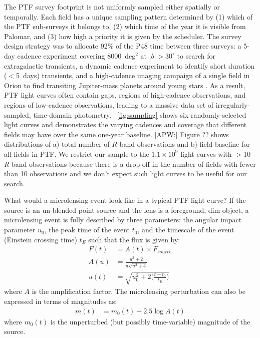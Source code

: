 \documentclass{emulateapj}
\newcommand{\apwsim}{\raisebox{0.2ex}{\scriptsize$\sim$\normalsize}}
\begin{document}
The PTF survey footprint is not uniformly sampled either spatially or temporally. Each field has a unique sampling pattern determined by (1) which of the PTF sub-surveys it belongs to, (2) which time of the year it is visible from Palomar, and (3) how high a priority it is given by the scheduler. The survey design strategy was to allocate 92\% of the P48 time between three surveys: a 5-day cadence experiment covering 8000~deg$^2$ at $|b|>30^\circ$ to search for extragalactic transients, a dynamic cadence experiment to identify  short duration ($<$5~days) transients, and a high-cadence imaging campaign of a single field in Orion to find transiting Jupiter-mass planets around young stars \citep{nick2009}. As a result, PTF light curves often contain gaps, regions of high-cadence observations, and regions of low-cadence observations, leading to a massive data set of irregularly-sampled, time-domain photometry. \figurename~\ref{fig:sampling} shows six randomly-selected light curves and demonstrates the varying cadences and coverage that different fields may have over the same one-year baseline. [APW:] Figure ?? shows distributions of a) total number of $R$-band observations and b) field baseline for all fields in PTF. We restrict our sample to the \apwsim$1.1\times10^9$ light curves with $>$10 \textit{R}-band observations because there is a drop off in the number of fields with fewer than 10 observations and we don't expect such light curves to be useful for our search. %

What would a microlensing event look like in a typical PTF light curve? If the source is an un-blended point source and the lens is a foreground, dim object, a microlensing event is fully described by three parameters: the angular impact parameter $u_0$, the peak time of the event $t_0$, and the timescale of the event (Einstein crossing time) $t_E$ such that the flux is given by:
\begin{align}
	F(t) &= A(t)\times F_{source} \\
	A(u) &= \frac{u^2 + 2}{u\sqrt{u^2 + 4}}\\
	u(t) &= \sqrt{u_0^2 + 2\Big(\frac{t-t_0}{t_E}\Big)}
\end{align}
where $A$ is the amplification factor. The microlensing perturbation can also be expressed in terms of magnitudes as:
\begin{align}
	m(t) &= m_0(t) - 2.5\log A(t)
\end{align}
where $m_0(t)$ is the unperturbed (but possibly time-variable) magnitude of the source.
\end{document}
